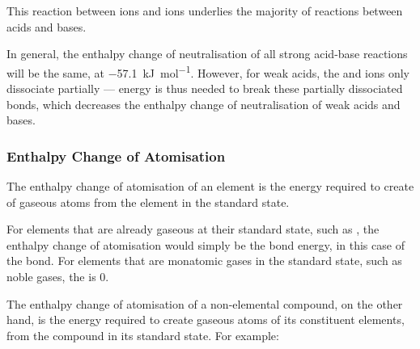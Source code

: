 				This reaction between  ions and  ions underlies the majority of reactions between acids and bases.


				In general, the enthalpy change of neutralisation of all strong acid-base reactions will be the same,
				at \SI{-57.1}{\kilo\joule\per\mole}. However, for weak acids, the  and  ions only dissociate
				partially --- energy is thus needed to break these partially dissociated bonds, which decreases the enthalpy change
				of neutralisation of weak acids and bases.





			\subsubsection{Enthalpy Change of Atomisation}

				The enthalpy change of atomisation of an element is the energy required to create  of gaseous atoms from the
				element in the standard state.


				For elements that are already gaseous at their standard state, such as , the enthalpy change of atomisation would
				simply be the bond energy, in this case of the  bond. For elements that are monatomic gases in the standard state,
				such as noble gases, the  is 0.


				The enthalpy change of atomisation of a non-elemental compound, on the other hand, is the energy required to create gaseous
				atoms of its constituent elements, from the compound in its standard state. For example:


